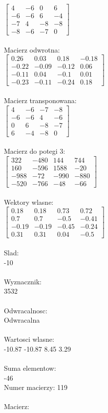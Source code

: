 \documentclass[a4paper,12pt]{article}
\begin{document}
$\begin{bmatrix} 4&-6&0&6\\-6&-6&6&-4\\-7&4&-8&-8\\-8&-6&-7&0 \end{bmatrix}$
\\
\\
Macierz odwrotna:\\

$\begin{bmatrix} 0.26&0.03&0.18&-0.18\\-0.22&-0.09&-0.12&0.06\\-0.11&0.04&-0.1&0.01\\-0.23&-0.11&-0.24&0.18 \end{bmatrix}$
\\
\\
Macierz transponowana:\\

$\begin{bmatrix} 4&-6&-7&-8\\-6&-6&4&-6\\0&6&-8&-7\\6&-4&-8&0 \end{bmatrix}$
\\
\\
Macierz do potegi 3:\\

$\begin{bmatrix} 322&-480&144&744\\160&-596&1588&-20\\-988&-72&-990&-880\\-520&-766&-48&-66 \end{bmatrix}$
\\
\\
Wektory wlasne:\\

$\begin{bmatrix} 0.18&0.18&0.73&0.72\\0.7&0.7&-0.5&-0.41\\-0.19&-0.19&-0.45&-0.24\\0.31&0.31&0.04&-0.5 \end{bmatrix}$
\\
\\
Slad:\\
-10
\\
\\
Wyznacznik:\\
3532
\\
\\
Odwracalnosc:\\
Odwracalna
\\
\\
Wartosci wlasne:\\
-10.87 -10.87 8.45 3.29
\\
\\
Suma elementow:\\
-46
\\
\newpage
Numer macierzy:
119
\\
\\
Macierz:\\
\end{document}
